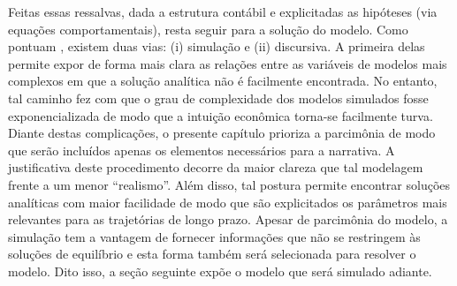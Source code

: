 


Feitas essas ressalvas, dada a estrutura contábil e explicitadas as hipóteses (via equações comportamentais), resta seguir para a solução do modelo. Como pontuam \textcite{caverzasi_stock-flow_2013}, existem duas vias: (i) simulação e (ii) discursiva. A primeira delas permite expor de forma mais clara as relações entre as variáveis de modelos mais complexos em que a solução analítica não é facilmente encontrada. No entanto, tal caminho fez com que o grau de complexidade dos modelos simulados fosse exponencializada de modo que a intuição econômica torna-se facilmente turva. Diante destas complicações, o presente capítulo prioriza a parcimônia de modo que serão incluídos apenas os elementos necessários para a narrativa. A justificativa deste procedimento decorre da maior clareza que tal modelagem frente a um menor ``realismo''.
Além disso, tal postura permite encontrar soluções analíticas com maior facilidade de modo que são explicitados os parâmetros mais relevantes para as trajetórias de longo prazo. Apesar de parcimônia do modelo, a simulação tem a vantagem
de fornecer informações que não se restringem às soluções de equilíbrio e esta forma
também será selecionada para resolver o modelo.
Dito isso, a seção seguinte expõe o modelo que será simulado adiante.
